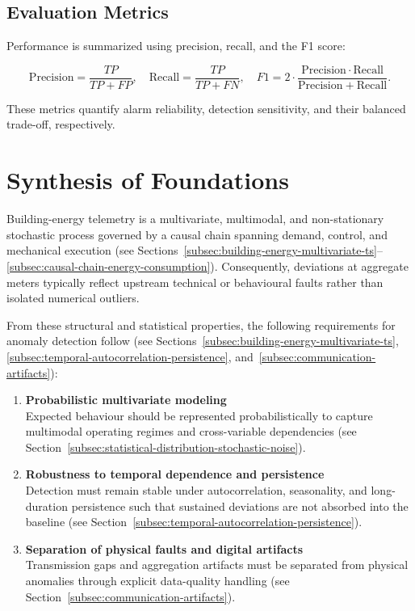 \subsection{Evaluation Metrics}

Performance is summarized using precision, recall, and the F1 score:

\[
\mathrm{Precision} = \frac{TP}{TP+FP}, \quad
\mathrm{Recall} = \frac{TP}{TP+FN}, \quad
F1 = 2 \cdot \frac{\mathrm{Precision}\cdot\mathrm{Recall}}{\mathrm{Precision}+\mathrm{Recall}}.
\]

These metrics quantify alarm reliability, detection sensitivity, and their balanced trade-off, respectively.

\section{Synthesis of Foundations}
\label{sec:synthesis-foundations}

Building-energy telemetry is a multivariate, multimodal, and non-stationary stochastic
process governed by a causal chain spanning demand, control, and mechanical execution
(see Sections~\ref{subsec:building-energy-multivariate-ts}--\ref{subsec:causal-chain-energy-consumption}).
Consequently, deviations at aggregate meters typically reflect upstream technical or
behavioural faults rather than isolated numerical outliers.

From these structural and statistical properties, the following requirements for anomaly
detection follow (see Sections~\ref{subsec:building-energy-multivariate-ts},
\ref{subsec:temporal-autocorrelation-persistence}, and~\ref{subsec:communication-artifacts}):

\begin{enumerate}
	\item \textbf{Probabilistic multivariate modeling}\label{req:probabilistic-multivariate}\\
	Expected behaviour should be represented probabilistically to capture multimodal
	operating regimes and cross-variable dependencies (see
	Section~\ref{subsec:statistical-distribution-stochastic-noise}).

	\item \textbf{Robustness to temporal dependence and persistence}\label{req:temporal-robustness}\\
	Detection must remain stable under autocorrelation, seasonality, and long-duration
	persistence such that sustained deviations are not absorbed into the baseline (see
	Section~\ref{subsec:temporal-autocorrelation-persistence}).

	\item \textbf{Separation of physical faults and digital artifacts}\label{req:artifact-separation}\\
	Transmission gaps and aggregation artifacts must be separated from physical anomalies
	through explicit data-quality handling (see
	Section~\ref{subsec:communication-artifacts}).
\end{enumerate}

